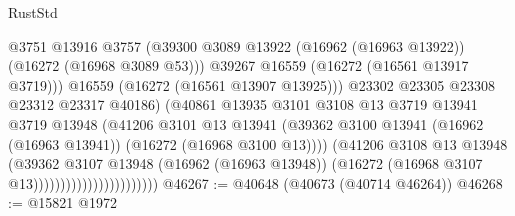 \begin{lexlean}{RustStd}
\begin{coremodule}
                                              @3751
                                              @13916
                                              @3757
                                              (@39300
                                                @3089
                                                @13922
                                                (@16962 (@16963 @13922))
                                                (@16272 (@16968 @3089 @53)))
                                              @39267
                                              @16559
                                              (@16272 (@16561 @13917 @3719)))
                                            @16559
                                            (@16272 (@16561 @13907 @13925)))
                                          @23302
                                          @23305
                                          @23308
                                          @23312
                                          @23317
                                          @40186)
                                        (@40861
                                          @13935
                                          @3101
                                          @3108
                                          @13
                                          @3719
                                          @13941
                                          @3719
                                          @13948
                                          (@41206
                                            @3101
                                            @13
                                            @13941
                                            (@39362
                                              @3100
                                              @13941
                                              (@16962 (@16963 @13941))
                                              (@16272 (@16968 @3100 @13))))
                                          (@41206
                                            @3108
                                            @13
                                            @13948
                                            (@39362
                                              @3107
                                              @13948
                                              (@16962 (@16963 @13948))
                                              (@16272 (@16968 @3107 @13)))))))))))))))))))))))
@46267 := @40648 (@40673 (@40714 @46264))
@46268 := @15821 @1972

\end{coremodule}
\end{lexlean}
